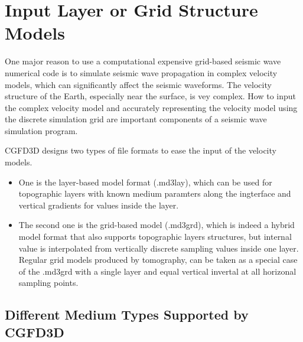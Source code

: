 

\chapter{Input Layer or Grid Structure Models}\label{chapter-media}


One major reason to use a computational expensive grid-based seismic wave numerical code
is to simulate seismic wave propagation in complex velocity models,
which can significantly affect the seismic waveforms.
The velocity structure of the Earth, especially near the surface, is vey complex.
How to input the complex velocity model and accurately representing 
the velocity model using the discrete simulation grid are important
components of a seismic wave simulation program.

CGFD3D designs two types of file formats to ease the input of the velocity models.
\begin{itemize}
  \item One is the layer-based model format (.md3lay),
which can be used for topographic layers with known medium paramters along the ingterface and vertical gradients for values inside the layer.
  \item The second one is the grid-based model (.md3grd), which is indeed a hybrid model format that also supports topographic layers structures,
but internal value is interpolated from vertically discrete sampling values inside one layer.
Regular grid models produced by tomography, can be taken as a special case of the .md3grd 
with a single layer and equal vertical invertal at all horizonal sampling points.
\end{itemize}


\section{Different Medium Types Supported by CGFD3D} \label{sec_medium_type} 

